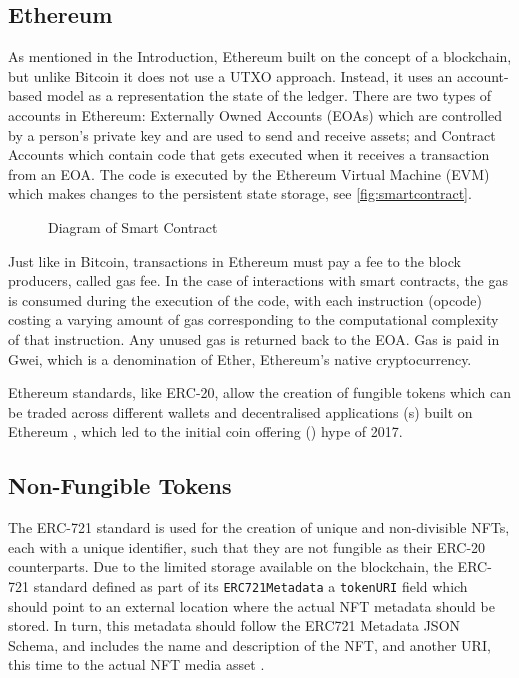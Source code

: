 \vspace{0.5cm}


\subsection{Ethereum}

As mentioned in the Introduction, Ethereum built on the concept of a blockchain, but unlike Bitcoin it does not use a UTXO approach. Instead, it uses an account-based model as a representation the state of the ledger. There are two types of accounts in Ethereum: Externally Owned Accounts (EOAs) which are controlled by a person's private key and are used to send and receive assets; and Contract Accounts which contain code that gets executed when it receives a transaction from an EOA. The code is executed by the Ethereum Virtual Machine (EVM) which makes changes to the persistent state storage, see \autoref{fig:smartcontract}.

\begin{figure}[h]
    \centering
    
    \caption[Diagram of Smart Contract]{Diagram of Smart Contract}
    \label{fig:smartcontract}
\end{figure}

Just like in Bitcoin, transactions in Ethereum must pay a fee to the block producers, called gas fee. In the case of interactions with smart contracts, the gas is consumed during the execution of the code, with each instruction (opcode) costing a varying amount of gas corresponding to the computational complexity of that instruction. Any unused gas is returned back to the EOA. Gas is paid in Gwei, which is a denomination of Ether, Ethereum's native cryptocurrency.

Ethereum standards, like ERC-20, allow the creation of fungible tokens which can be traded across different wallets and \gls{decentralised application}s (s) built on Ethereum \needcite, which led to the \gls{initial coin offering} () hype of 2017. \needcite


\subsection{Non-Fungible Tokens}

The ERC-721 standard is used for the creation of unique and non-divisible NFTs, each with a unique identifier, such that they are not fungible as their ERC-20 counterparts.
Due to the limited storage available on the blockchain, the ERC-721 standard defined as part of its \texttt{ERC721Metadata} a \texttt{tokenURI} field which should point to an external location where the actual NFT metadata should be stored. In turn, this metadata should follow the ERC721 Metadata JSON Schema, and includes the name and description of the NFT, and another URI, this time to the actual NFT media asset \cite{ERC721NonFungibleToken}.

